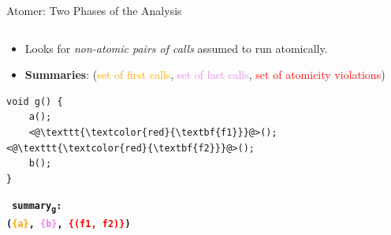 \documentclass[10pt, hyperref={unicode}, aspectratio=169]{beamer}
\begin{document}
\begin{frame}[fragile]{Atomer: Two Phases of the Analysis}
\begin{columns}
\begin{column}[T]{.5 \linewidth}
            \begin{itemize}
                \item
                    Looks for \emph{non-atomic pairs of calls}
                    assumed to run atomically.
                    
                \item
                    \textbf{Summaries}: (\textcolor{orange}{set of
                    first calls}, \textcolor{violet}{set of last
                    calls}, \textcolor{red}{set of atomicity
                    violations})
            \end{itemize}

            \begin{lstlisting}
void g() {
    a();
    <@\texttt{\textcolor{red}{\textbf{f1}}}@>(); <@\texttt{\textcolor{red}{\textbf{f2}}}@>();
    b();
}
            \end{lstlisting}

            \textbf{\texttt{\footnotesize
                \alert{summary\textsubscript{g}}: \\
                (\textcolor{orange}{\{a\}},
                \textcolor{violet}{\{b\}},
                \textcolor{red}{\{(f1, f2)\}})
            }}
        \end{column}
    \end{columns}
\end{frame}
\end{document}
